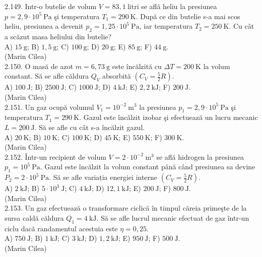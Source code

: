 2.149. Intr-o butelie de volum $V=83,1 \mathrm{~litri}$ se aflã heliu la presiunea $p=2,9 \cdot 10^{5} \mathrm{~Pa}$ şi temperatura $T_{1}=290 \mathrm{~K}$. După ce din butelie s-a mai scos heliu, presiunea a devenit $p_{2}=1,25 \cdot 10^{5} \mathrm{~Pa}$, iar temperatura $T_{2}=250 \mathrm{~K}$. Cu cât a scăzut masa heliului din butelie?\\ A) $15 \mathrm{~g}$; B) $1,5 \mathrm{~g}$; C) $100 \mathrm{~g}$; D) $20 \mathrm{~g}$; E) $85 \mathrm{~g}$; F) $44 \mathrm{~g}$.\\ (Marin Cilea)\\

2.150. O masă de azot $m=6,73 \mathrm{~g}$ este încălzită cu $\Delta T=200 \mathrm{~K}$ la volum constant. Să se afle căldura $Q_{V}$ absorbită $\left(C_{V}=\frac{5}{2} R\right)$.\\ A) $100 \mathrm{~J}$; B) $2500 \mathrm{~J}$; C) $1000 \mathrm{~J}$; D) $4 \mathrm{~kJ}$; E) $2,2 \mathrm{~kJ}$; F) $200 \mathrm{~J}$.\\ (Marin Cilea)\\

2.151. Un gaz ocupă volumul $V_{1}=10^{-2} \mathrm{~m}^{3}$ la presiunea $p_{1}=2,9 \cdot 10^{5} \mathrm{~Pa}$ şi temperatura $T_{1}=290 \mathrm{~K}$. Gazul este încǎlzit izobar şi efectuează un lucru mecanic $L=200 \mathrm{~J}$. Să se afle cu cât s-a încălzit gazul.\\ A) $20 \mathrm{~K}$; B) $10 \mathrm{~K}$; C) $100 \mathrm{~K}$; D) $45 \mathrm{~K}$; E) $550 \mathrm{~K}$; F) $300 \mathrm{~K}$.\\ (Marin Cilea)\\

2.152. Într-un recipient de volum $V=2 \cdot 10^{-2} \mathrm{~m}^{3}$ se află hidrogen la presiunea $p_{1}=10^{5} \mathrm{~Pa}$. Gazul este încălzit la volum constant până când presiunea sa devine $P_{2}=2 \cdot 10^{5} \mathrm{~Pa}$. Să se afle variația energiei interne $\left(C_{V}=\frac{5}{2} R\right)$.\\ A) $2 \mathrm{~kJ}$; B) $5 \cdot 10^{3} \mathrm{~J}$; C) $4 \mathrm{~kJ}$; D) $12,1 \mathrm{~kJ}$; E) $200 \mathrm{~J}$; F) $800 \mathrm{~J}$.\\ (Marin Cilea)\\

2.153. Un gaz efectuează o transformare ciclică în timpul căreia primeşte de la sursa caldă căldura $Q_{1}=4 \mathrm{~kJ}$. Să se afle lucrul mecanic efectuat de gaz într-un ciclu dacã randamentul acestuia este $\eta=0,25$.\\ A) $750 \mathrm{~J}$; B) $1 \mathrm{~kJ}$; C) $3 \mathrm{~kJ}$; D) $1,2 \mathrm{~kJ}$; E) $950 \mathrm{~J}$; F) $500 \mathrm{~J}$.\\ (Marin Cilea)\\

